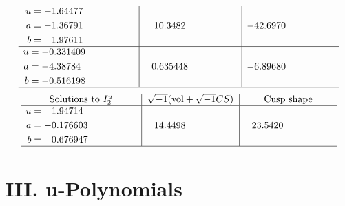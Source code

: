 \documentclass[1p]{elsarticle_modified}
\theoremstyle{definition}
\newcommand{\I}{\sqrt{-1}}
\begin{document}
$$\begin{array}{c|c|c}
\begin{aligned}
u &= -1.64477\phantom{ +0.000000I} \\
a &= -1.36791\phantom{ +0.000000I} \\
b &= \phantom{-}1.97611\phantom{ +0.000000I}\end{aligned}
 & \phantom{-}10.3482\phantom{ +0.000000I} & -42.6970\phantom{ +0.000000I} \\ \hline\begin{aligned}
u &= -0.331409\phantom{ +0.000000I} \\
a &= -4.38784\phantom{ +0.000000I} \\
b &= -0.516198\phantom{ +0.000000I}\end{aligned}
 & \phantom{-}0.635448\phantom{ +0.000000I} & -6.89680\phantom{ +0.000000I}\\
 \hline 
 \end{array}$$\newpage$$\begin{array}{c|c|c}  
\text{Solutions to }I^u_{2}& \I (\text{vol} + \sqrt{-1}CS) & \text{Cusp shape}\\
 \hline 
\begin{aligned}
u &= \phantom{-}1.94714\phantom{ +0.000000I} \\
a &= -0.176603\phantom{ +0.000000I} \\
b &= \phantom{-}0.676947\phantom{ +0.000000I}\end{aligned}
 & \phantom{-}14.4498\phantom{ +0.000000I} & \phantom{-}23.5420\phantom{ +0.000000I}\\
 \hline 
 \end{array}$$\newpage
\newpage\renewcommand{\arraystretch}{1}
\centering \section*{ III. u-Polynomials}
\end{document}
